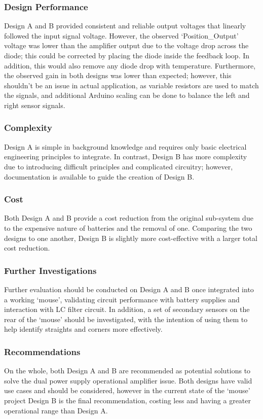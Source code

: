 \subsubsection{Design Performance}
Design A and B provided consistent and reliable output voltages that linearly followed the input signal voltage. However, the observed `Position\_Output' voltage was lower than the amplifier output due to the voltage drop across the diode; this could be corrected by placing the diode inside the feedback loop. In addition, this would also remove any diode drop with temperature. Furthermore, the observed gain in both designs was lower than expected; however, this shouldn't be an issue in actual application, as variable resistors are used to match the signals, and additional Arduino scaling can be done to balance the left and right sensor signals.

\subsubsection{Complexity}
Design A is simple in background knowledge and requires only basic electrical engineering principles to integrate. In contrast, Design B has more complexity due to introducing difficult principles and complicated circuitry; however, documentation is available to guide the creation of Design B.

\subsubsection{Cost}
Both Design A and B provide a cost reduction from the original sub-system due to the expensive nature of batteries and the removal of one. Comparing the two designs to one another, Design B is slightly more cost-effective with a larger total cost reduction.

\subsubsection{Further Investigations}
Further evaluation should be conducted on Design A and B once integrated into a working `mouse', validating circuit performance with battery supplies and interaction with LC filter circuit. In addition, a set of secondary sensors on the rear of the `mouse' should be investigated, with the intention of using them to help identify straights and corners more effectively.

\subsubsection{Recommendations}
On the whole, both Design A and B are recommended as potential solutions to solve the dual power supply operational amplifier issue. Both designs have valid use cases and should be considered, however in the current state of the `mouse' project Design B is the final recommendation, costing less and having a greater operational range than Design A.





